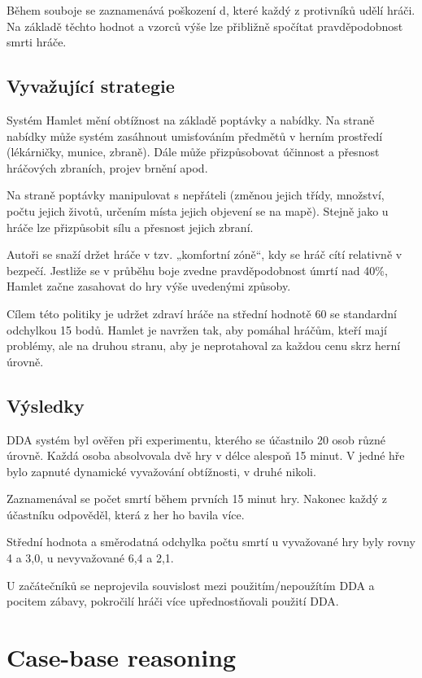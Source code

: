 Během souboje se zaznamenává poškození d, které každý z protivníků udělí hráči. Na základě těchto hodnot a vzorců výše lze přibližně spočítat pravděpodobnost smrti hráče.

\subsection{Vyvažující strategie}

Systém Hamlet mění obtížnost na základě poptávky a nabídky. Na straně nabídky může systém zasáhnout umisťováním předmětů v herním prostředí (lékárničky, munice, zbraně). Dále může přizpůsobovat účinnost a přesnost hráčových zbraních, projev brnění apod.

Na straně poptávky manipulovat s nepřáteli (změnou jejich třídy, množství, počtu jejich životů, určením místa jejich objevení se na mapě). Stejně jako u hráče lze přizpůsobit sílu a přesnost jejich zbraní.

Autoři se snaží držet hráče v tzv. „komfortní zóně“, kdy se hráč cítí relativně v bezpečí. Jestliže se v průběhu boje zvedne pravděpodobnost úmrtí nad 40\%, Hamlet začne zasahovat do hry výše uvedenými způsoby.

Cílem této politiky je udržet zdraví hráče na střední hodnotě 60 se standardní odchylkou 15 bodů. Hamlet je navržen tak, aby pomáhal hráčům, kteří mají problémy, ale na druhou stranu, aby je neprotahoval za každou cenu skrz herní úrovně.

\subsection{Výsledky}

DDA systém byl ověřen při experimentu, kterého se účastnilo 20 osob různé úrovně. Každá osoba absolvovala dvě hry v délce alespoň 15 minut. V jedné hře bylo zapnuté dynamické vyvažování obtížnosti, v druhé nikoli.

Zaznamenával se počet smrtí během prvních 15 minut hry. Nakonec každý z účastníku odpověděl, která z her ho bavila více.

Střední hodnota a směrodatná odchylka počtu smrtí u vyvažované hry byly rovny 4 a 3,0, u nevyvažované 6,4 a 2,1.

U začátečníků se neprojevila souvislost mezi použitím/nepoužítím DDA a pocitem zábavy, pokročilí hráči více upřednostňovali použití DDA.

\section{Case-base reasoning} \label{sec:CBR}

